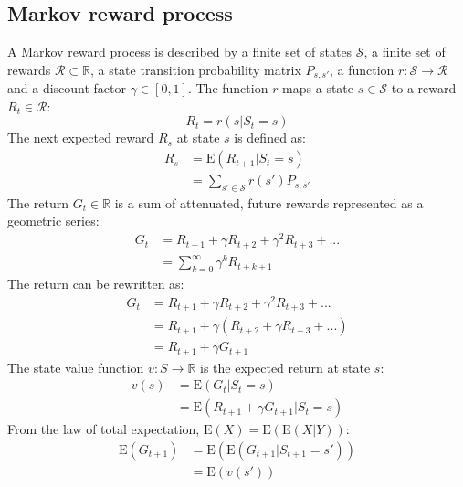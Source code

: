 \documentclass{article}
\begin{document}
\subsection{Markov reward process}
A Markov reward process is described by a finite set of states $ \mathcal{S} $, a finite set of rewards $ \mathcal{R} \subset \mathbb{R} $, a state transition probability matrix $ P_{s,s'} $, a function $r: \mathcal{S} \to \mathcal{R} $ and a discount factor $ \gamma \in [0, 1] $. The function $ r $ maps a state $  s \in \mathcal{S} $ to a reward $ R_t \in \mathcal{R} $:
\[ R_t = r(s | S_t = s) \]
The next expected reward $ R_s $ at state $ s $ is defined as:
\begin{equation*}
\begin{split}
R_s & =\text{E}(R_{t+1} | S_t = s) \\
 & = \sum_{s' \in \mathcal{S}} r(s') P_{s,s'}
\end{split}
\end{equation*}
The return $ G_t \in \mathbb{R} $ is a sum of attenuated, future rewards represented as a geometric series:
\begin{equation*}
\begin{split}
G_t & = R_{t+1} + \gamma R_{t+2} + \gamma^{2} R_{t+3} + ... \\
 & = \sum_{k = 0}^{\infty} \gamma^{k} R_{t+k+1}
\end{split}
\end{equation*}
The return can be rewritten as:
\begin{equation*}
\begin{split}
G_t & = R_{t+1} + \gamma R_{t+2} + \gamma^{2} R_{t+3} + ... \\
 & = R_{t+1} + \gamma ( R_{t+2} + \gamma R_{t+3} + ...) \\
 & = R_{t+1} + \gamma G_{t+1}
\end{split}
\end{equation*}
The state value function $ v: S \to \mathbb{R} $ is the expected return at state $ s $:
\begin{equation*}
\begin{split}
v(s) & = \text{E}(G_t | S_t = s) \\
 & = \text{E}(R_{t+1} + \gamma G_{t+1} | S_t = s)
\end{split}
\end{equation*}
From the law of total expectation, $ \text{E}(X) = \text{E}(\text{E}(X|Y)) $:
\begin{equation*}
\begin{split}
\text{E}(G_{t+1}) & = \text{E}(\text{E}(G_{t+1}|S_{t+1} = s')) \\
& = \text{E}(v(s'))
\end{split}
\end{equation*}
\end{document}
